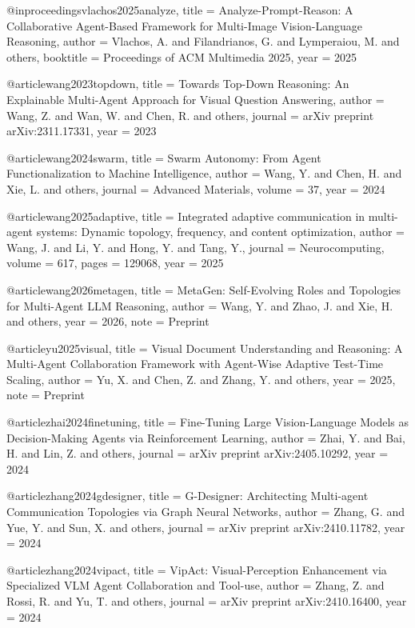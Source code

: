 @inproceedings{vlachos2025analyze,
  title   = {Analyze-Prompt-Reason: A Collaborative Agent-Based Framework for Multi-Image Vision-Language Reasoning},
  author  = {Vlachos, A. and Filandrianos, G. and Lymperaiou, M. and others},
  booktitle = {Proceedings of ACM Multimedia 2025},
  year    = {2025}
}

@article{wang2023topdown,
  title   = {Towards Top-Down Reasoning: An Explainable Multi-Agent Approach for Visual Question Answering},
  author  = {Wang, Z. and Wan, W. and Chen, R. and others},
  journal = {arXiv preprint arXiv:2311.17331},
  year    = {2023}
}

@article{wang2024swarm,
  title   = {Swarm Autonomy: From Agent Functionalization to Machine Intelligence},
  author  = {Wang, Y. and Chen, H. and Xie, L. and others},
  journal = {Advanced Materials},
  volume  = {37},
  year    = {2024}
}

@article{wang2025adaptive,
  title   = {Integrated adaptive communication in multi-agent systems: Dynamic topology, frequency, and content optimization},
  author  = {Wang, J. and Li, Y. and Hong, Y. and Tang, Y.},
  journal = {Neurocomputing},
  volume  = {617},
  pages   = {129068},
  year    = {2025}
}

@article{wang2026metagen,
  title   = {{MetaGen}: Self-Evolving Roles and Topologies for Multi-Agent {LLM} Reasoning},
  author  = {Wang, Y. and Zhao, J. and Xie, H. and others},
  year    = {2026},
  note    = {Preprint}
}

@article{yu2025visual,
  title   = {Visual Document Understanding and Reasoning: A Multi-Agent Collaboration Framework with Agent-Wise Adaptive Test-Time Scaling},
  author  = {Yu, X. and Chen, Z. and Zhang, Y. and others},
  year    = {2025},
  note    = {Preprint}
}

@article{zhai2024finetuning,
  title   = {Fine-Tuning Large Vision-Language Models as Decision-Making Agents via Reinforcement Learning},
  author  = {Zhai, Y. and Bai, H. and Lin, Z. and others},
  journal = {arXiv preprint arXiv:2405.10292},
  year    = {2024}
}

@article{zhang2024gdesigner,
  title   = {{G-Designer}: Architecting Multi-agent Communication Topologies via Graph Neural Networks},
  author  = {Zhang, G. and Yue, Y. and Sun, X. and others},
  journal = {arXiv preprint arXiv:2410.11782},
  year    = {2024}
}

@article{zhang2024vipact,
  title   = {{VipAct}: Visual-Perception Enhancement via Specialized {VLM} Agent Collaboration and Tool-use},
  author  = {Zhang, Z. and Rossi, R. and Yu, T. and others},
  journal = {arXiv preprint arXiv:2410.16400},
  year    = {2024}
}

